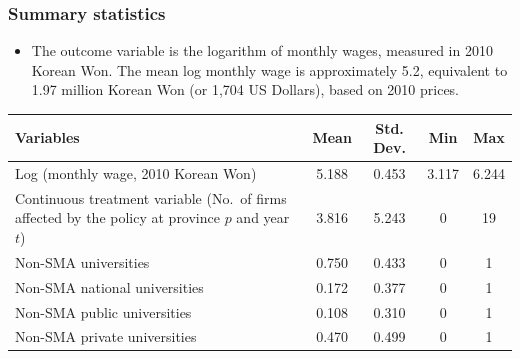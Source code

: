 \documentclass[aspectratio=169,xcolor=dvipsnames,handout]{beamer}
\begin{document}
\begin{frame}
    \frametitle{Summary statistics}
    \begin{itemize}[<+->]
        \item The outcome variable is the logarithm of monthly wages, measured in 2010 Korean Won. The mean log monthly wage is approximately 5.2, equivalent to 1.97 million Korean Won (or 1,704 US Dollars), based on 2010 prices. 
    \end{itemize}
    \begin{table}[ht]
        \tiny
        \centering
        \begin{tabular}{lcccc}
        \toprule
        \textbf{Variables} & \textbf{Mean} & \textbf{Std. Dev.} & \textbf{Min} & \textbf{Max} \\
        \midrule
        Log (monthly wage, 2010 Korean Won) & 5.188 & 0.453 & 3.117 & 6.244 \\
        Continuous treatment variable (No.\ of firms affected by the policy at province \(p\) and year \(t\)) & 3.816 & 5.243 & 0 & 19 \\
        Non-SMA universities          & 0.750 & 0.433 & 0 & 1 \\
        Non-SMA national universities & 0.172 & 0.377 & 0 & 1 \\
        Non-SMA public universities   & 0.108 & 0.310 & 0 & 1 \\
        Non-SMA private universities  & 0.470 & 0.499 & 0 & 1 \\
        \bottomrule
        \end{tabular}
    \end{table}
\end{frame}
\end{document}
